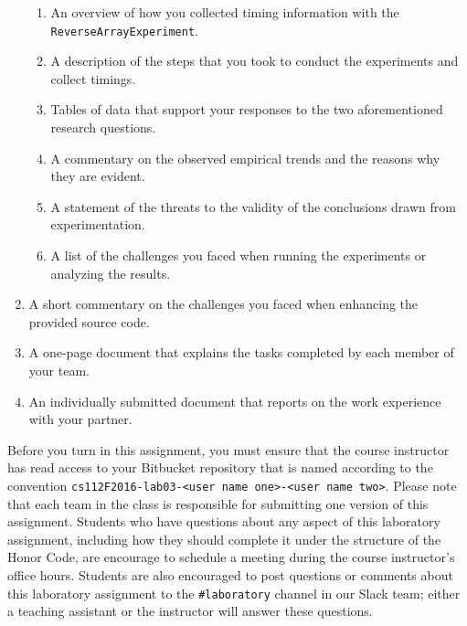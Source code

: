 \begin{enumerate}
    \vspace*{-.05in}
    \begin{enumerate}
      \itemsep 0em
      \item An overview of how you collected timing information with the {\tt ReverseArrayExperiment}.
      \item A description of the steps that you took to conduct the experiments and collect timings.
      \item Tables of data that support your responses to the two aforementioned research questions.
      \item A commentary on the observed empirical trends and the reasons why they are evident.
      \item A statement of the threats to the validity of the conclusions drawn from experimentation.
      \item A list of the challenges you faced when running the experiments or analyzing the results.
    \end{enumerate}

  \item A short commentary on the challenges you faced when enhancing the provided source code.

  \item A one-page document that explains the tasks completed by each member of your team.

  \item An individually submitted document that reports on the work experience with your partner.

\end{enumerate}

\vspace*{-.05in}

Before you turn in this assignment, you must ensure that the course instructor has read access to your Bitbucket
repository that is named according to the convention {\tt cs112F2016-lab03-<user name one>-<user name two>}. Please note
that each team in the class is responsible for submitting one version of this assignment. Students who have questions
about any aspect of this laboratory assignment, including how they should complete it under the structure of the Honor
Code, are encourage to schedule a meeting during the course instructor's office hours. Students are also encouraged to
post questions or comments about this laboratory assignment to the {\tt \#laboratory} channel in our Slack team; either
a teaching assistant or the instructor will answer these questions.


